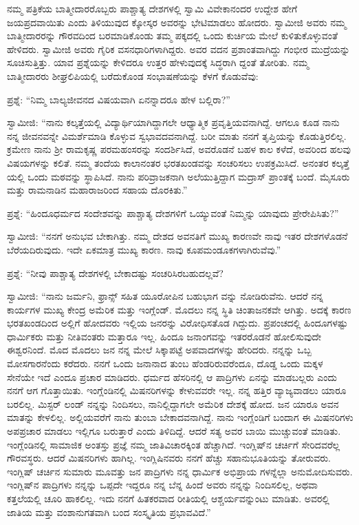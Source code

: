 ನಮ್ಮ ಪತ್ರಿಕೆಯ ಬಾತ್ಮೀದಾರರೊಬ್ಬರು ಪಾಶ್ಚಾತ್ಯ ದೇಶಗಳಲ್ಲಿ ಸ್ವಾಮಿ ವಿವೇಕಾನಂದರ ಉದ್ದೇಶ ಹೇಗೆ ಜಯಪ್ರದವಾಯಿತು ಎಂದು ತಿಳಿಯುವುದ ಕ್ಕೋಸ್ಕರ ಅವರನ್ನು ಭೇಟಿಮಾಡಲು ಹೋದರು. ಸ್ವಾಮೀಜಿ ಅವರು ನಮ್ಮ ಬಾತ್ಮೀದಾರರನ್ನು ಗೌರವದಿಂದ ಬರಮಾಡಿಕೊಂಡು ತಮ್ಮ ಪಕ್ಕದಲ್ಲಿ ಒಂದು ಕುರ್ಚಿಯ ಮೇಲೆ ಕುಳಿತುಕೊಳ್ಳುವಂತೆ ಹೇಳಿದರು. ಸ್ವಾಮೀಜಿ ಅವರು ಗೈರಿಕ ವಸನಧಾರಿಗಳಾಗಿದ್ದರು. ಅವರ ವದನ ಪ್ರಶಾಂತವಾಗಿದ್ದು ಗಂಭೀರ ಮುದ್ರೆಯನ್ನು ಸೂಚಿಸುತ್ತಿತ್ತು. ಯಾವ ಪ್ರಶ್ನೆಯನ್ನು ಕೇಳಿದರೂ ಉತ್ತರ ಹೇಳುವುದಕ್ಕೆ ಸಿದ್ಧರಾಗಿ ದ್ದಂತೆ ತೋರಿತು. ನಮ್ಮ ಬಾತ್ಮೀದಾರರು ಶೀಘ್ರಲಿಪಿಯಲ್ಲಿ ಬರೆದುಕೊಂಡ ಸಂಭಾಷಣೆಯನ್ನು ಕೆಳಗೆ ಕೊಡುವೆವು:

ಪ್ರಶ್ನೆ: “ನಿಮ್ಮ ಬಾಲ್ಯಜೀವನದ ವಿಷಯವಾಗಿ ಏನನ್ನಾದರೂ ಹೇಳ ಬಲ್ಲಿರಾ?”

ಸ್ವಾಮೀಜಿ: “ನಾನು ಕಲ್ಕತ್ತೆಯಲ್ಲಿ ವಿದ್ಯಾರ್ಥಿಯಾಗಿದ್ದಾಗಲೇ ಆಧ್ಯಾತ್ಮಿಕ ಪ್ರವೃತ್ತಿಯವನಾಗಿದ್ದೆ. ಆಗಲೂ ಕೂಡ ನಾನು ನನ್ನ ಜೀವನವನ್ನೇ ವಿಮರ್ಶೆಮಾಡಿ ಕೊಳ್ಳುವ ಸ್ವಭಾವದವನಾಗಿದ್ದೆ. ಬರೀ ಮಾತು ನನಗೆ ತೃಪ್ತಿಯನ್ನು ಕೊಡುತ್ತಿರಲಿಲ್ಲ. ಕ್ರಮೇಣ ನಾನು ಶ‍್ರೀ ರಾಮಕೃಷ್ಣ ಪರಮಹಂಸರನ್ನು ಸಂದರ್ಶಿಸಿದೆ, ಅವರೊಡನೆ ಬಹಳ ಕಾಲ ಕಳೆದೆ, ಅವರಿಂದ ಹಲವು ವಿಷಯಗಳನ್ನು ಕಲಿತೆ. ನಮ್ಮ ತಂದೆಯ ಕಾಲಾನಂತರ ಭರತಖಂಡವನ್ನು ಸಂಚರಿಸಲು ಉಪಕ್ರಮಿಸಿದೆ. ಅನಂತರ ಕಲ್ಕತ್ತೆ ಯಲ್ಲಿ ಒಂದು ಮಠವನ್ನು ಸ್ಥಾಪಿಸಿದೆ. ನಾನು ಪರಿವ್ರಾಜಕನಾಗಿ ಅಲೆಯುತ್ತಿದ್ದಾಗ ಮದ್ರಾಸ್​ ಪ್ರಾಂತಕ್ಕೆ ಬಂದೆ. ಮೈಸೂರು ಮತ್ತು ರಾಮನಾಡಿನ ಮಹಾರಾಜರಿಂದ ಸಹಾಯ ದೊರಕಿತು.”

ಪ್ರಶ್ನೆ: “ಹಿಂದೂಧರ್ಮದ ಸಂದೇಶವನ್ನು ಪಾಶ್ಚಾತ್ಯ ದೇಶಗಳಿಗೆ ಒಯ್ಯುವಂತೆ ನಿಮ್ಮನ್ನು ಯಾವುದು ಪ್ರೇರೇಪಿಸಿತು?”

ಸ್ವಾಮೀಜಿ: “ನನಗೆ ಅನುಭವ ಬೇಕಾಗಿತ್ತು. ನಮ್ಮ ದೇಶದ ಅವನತಿಗೆ ಮುಖ್ಯ ಕಾರಣವೇ ನಾವು ಇತರ ದೇಶಗಳೊಡನೆ ಬೆರೆಯದಿರುವುದು. ಇದೇ ಏಕಮಾತ್ರ ಮುಖ್ಯ ಕಾರಣ. ನಾವು ಕೂಪಮಂಡೂಕಗಳಾಗಿರುವೆವು.”

ಪ್ರಶ್ನೆ: “ನೀವು ಪಾಶ್ಚಾತ್ಯ ದೇಶಗಳಲ್ಲಿ ಬೇಕಾದಷ್ಟು ಸಂಚರಿಸಿರಬಹುದಲ್ಲವೆ?

ಸ್ವಾಮೀಜಿ: “ನಾನು ಜರ್ಮನಿ, ಫ್ರಾನ್ಸ್​ ಸಹಿತ ಯೂರೋಪಿನ ಬಹುಭಾಗ ವನ್ನು ನೋಡಿರುವೆನು. ಆದರೆ ನನ್ನ ಕಾರ್ಯಗಳ ಮುಖ್ಯ ಕೇಂದ್ರ ಅಮೆರಿಕ ಮತ್ತು ಇಂಗ್ಲೆಂಡ್​. ಮೊದಲು ನನ್ನ ಸ್ಥಿತಿ ಚಿಂತಾಜನಕವೇ ಆಗಿತ್ತು. ಅದಕ್ಕೆ ಕಾರಣ ಭರತಖಂಡದಿಂದ ಅಲ್ಲಿಗೆ ಹೋದವರು ಇಲ್ಲಿಯ ಜನರನ್ನು ವಿರೋಧಿಸತೊಡ ಗಿದ್ದುದು. ಪ್ರಪಂಚದಲ್ಲಿ ಹಿಂದೂಗಳಷ್ಟು ಧಾರ್ಮಿಕರು ಮತ್ತು ನೀತಿವಂತರು ಮತ್ತಾರೂ ಇಲ್ಲ. ಹಿಂದೂ ಜನಾಂಗವನ್ನು ಇತರರೊಡನೆ ಹೋಲಿಸುವುದೇ ಈಶ್ವರನಿಂದೆ. ಮೊದ ಮೊದಲು ಜನ ನನ್ನ ಮೇಲೆ ಸಿಕ್ಕಾಪಟ್ಟೆ ಅಪವಾದಗಳನ್ನು ಹೇರಿದರು. ನನ್ನನ್ನು ಒಬ್ಬ ಮೋಸಗಾರನೆಂದು ಕರೆದರು. ನನಗೆ ಒಂದು ಜನಾನಾದ ತುಂಬ ಹೆಂಡರಿರುವರೆಂದೂ, ದೊಡ್ಡ ಒಂದು ಮಕ್ಕಳ ಸೇನೆಯೇ ಇದೆ ಎಂದೂ ಪ್ರಚಾರ ಮಾಡಿದರು. ಧರ್ಮದ ಹೆಸರಿನಲ್ಲಿ ಆ ಪಾದ್ರಿಗಳು ಏನನ್ನು ಮಾಡಬಲ್ಲರು ಎಂದು ನನಗೆ ಆಗ ಗೊತ್ತಾಯಿತು. ಇಂಗ್ಲೆಂಡಿನಲ್ಲಿ ಮಿಷನರಿಗಳನ್ನು ಕೇಳುವವರೇ ಇಲ್ಲ. ನನ್ನ ಹತ್ತಿರ ವ್ಯಾಜ್ಯವಾಡಲು ಯಾರೂ ಬರಲಿಲ್ಲ. ಮಿಸ್ಟರ್​ ಲಂಡ್​ ನನ್ನನ್ನು ನಿಂದಿಸಲು, ನಾನಿಲ್ಲಿದ್ದಾಗಲೇ ಅಮೆರಿಕ ದೇಶಕ್ಕೆ ಹೋದ. ಜನ ಯಾರೂ ಅವನ ಮಾತನ್ನು ಕೇಳಲಿಲ್ಲ. ಅಲ್ಲಿಯವರೆಗೆ ನಾನು ತುಂಬಾ ಬೇಕಾದವನಾಗಿದ್ದೆ. ನಾನು ಇಂಗ್ಲೆಂಡಿಗೆ ಬಂದಾಗ ಈ ಮಿಷನರಿಗಳು ಅಪಪ್ರಚಾರ ಮಾಡಲು ಇಲ್ಲಿಗೂ ಬರುತ್ತಾರೆ ಎಂದು ತಿಳಿದಿದ್ದೆ. ಆದರೆ ಸತ್ಯ ಅವರ ಬಾಯಿ ಮುಚ್ಚುವಂತೆ ಮಾಡಿತು. ಇಂಗ್ಲೆಂಡಿನಲ್ಲಿ ಸಾಮಾಜಿಕ ಅಂತಸ್ತು ಪ್ರಜ್ಞೆ ನಮ್ಮ ಜಾತಿವಿಚಾರಕ್ಕಿಂತ ಹೆಚ್ಚಾಗಿದೆ. ಇಂಗ್ಲಿಷ್​ನ ಚರ್ಚಿಗೆ ಸೇರಿದವರೆಲ್ಲ ಗೌರವಸ್ಥರು. ಆದರೆ ಮಿಷನರಿಗಳು ಹಾಗಿಲ್ಲ. ಇಂಗ್ಲಿಷಿನವರು ನನಗೆ ಹೆಚ್ಚು ಸಹಾನುಭೂತಿಯನ್ನು ತೋರುವರು. ಇಂಗ್ಲಿಷ್​ ಚರ್ಚಿನ ಸುಮಾರು ಮೂವತ್ತು ಜನ ಪಾದ್ರಿಗಳು ನನ್ನ ಧಾರ್ಮಿಕ ಅಭಿಪ್ರಾಯ ಗಳನ್ನೆಲ್ಲಾ ಅನುಮೋದಿಸುವರು. ಇಂಗ್ಲಿಷ್​ನ ಪಾದ್ರಿಗಳು ನನ್ನನ್ನು ಒಪ್ಪದೇ ಇದ್ದರೂ ನನ್ನ ಬೆನ್ನ ಹಿಂದೆ ಅವರು ನನ್ನನ್ನು ನಿಂದಿಸಲಿಲ್ಲ, ಅಥವಾ ಕತ್ತಲೆಯಲ್ಲಿ ಚೂರಿ ಹಾಕಲಿಲ್ಲ. ಇದು ನನಗೆ ಹಿತಕರವಾದ ರೀತಿಯಲ್ಲಿ ಆಶ್ಚರ್ಯವನ್ನುಂಟು ಮಾಡಿತು. ಅವರಲ್ಲಿ ಜಾತಿಯ ಮತ್ತು ವಂಶಾನುಗತವಾಗಿ ಬಂದ ಸಂಸ್ಕೃತಿಯ ಪ್ರಭಾವವಿದೆ.”


